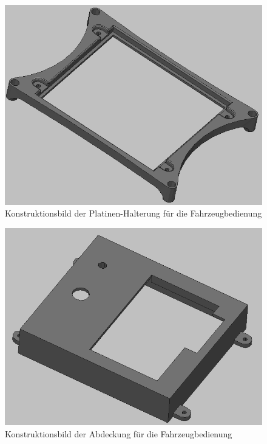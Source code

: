 \hspace{-3mm}
\begin{minipage}[t]{0.47\textwidth}
\vspace{-6mm}
\begin{figure}[H] %
\includegraphics[width=.85\textwidth]{sec2/images/3DAnbaukomponenten/Konstruktionsbilder/PlatinenHalterungKonstruktion} 
\centering
\captionsetup{width=.9\textwidth}
\caption[Konstruktionsbild der Platinen-Halterung für die Fahrzeugbedienung]{Konstruktionsbild der Platinen-Halterung für die Fahrzeugbedienung}
\centering
\label{fig:PlatinenHalterungKonstruktion}
\end{figure}
\end{minipage}
\begin{minipage}[t]{0.47\textwidth}
\vspace{-6mm}
\begin{figure}[H] %
\includegraphics[width=.85\textwidth]{sec2/images/3DAnbaukomponenten/Konstruktionsbilder/DisplayAbdeckungKonstruktion} 
\centering
\captionsetup{width=.9\textwidth}
\caption[Konstruktionsbild der Abdeckung für die Fahrzeugbedienung]{Konstruktionsbild der Abdeckung für die Fahrzeugbedienung}
\centering
\label{fig:DisplayAbdeckungKonstruktion}
\end{figure}
\end{minipage}
\vspace{4mm}


